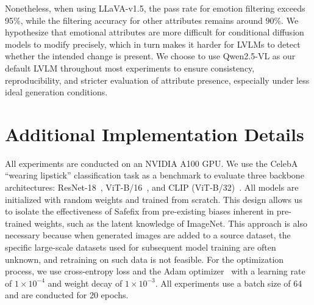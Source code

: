 \documentclass[10pt]{article} %
\newcommand{\qwen}{Qwen2.5-VL\xspace}
\newcommand{\llava}{LLaVA-v1.5\xspace}
\begin{document}
Nonetheless, when using \llava, the pass rate for emotion filtering exceeds 95\%, while the filtering accuracy for other attributes remains around 90\%. We hypothesize that emotional attributes are more difficult for conditional diffusion models to modify precisely, which in turn makes it harder for LVLMs to detect whether the intended change is present. We choose to use \qwen as our default LVLM throughout most experiments to ensure consistency, reproducibility, and stricter evaluation of attribute presence, especially under less ideal generation conditions.



\section{Additional Implementation Details} 
All experiments are conducted on an NVIDIA A100 GPU. We use the CelebA ``wearing lipstick'' classification task as a benchmark to evaluate three backbone architectures: ResNet-18~\citep{he2016deep}, ViT-B/16~\citep{dosovitskiy2020vit}, and CLIP (ViT-B/32)~\citep{radford2021learning}. All models are initialized with random weights and trained from scratch. This design allows us to isolate the effectiveness of Safefix from pre-existing biases inherent in pre-trained weights, such as the latent knowledge of ImageNet. This approach is also necessary because when generated images are added to a source dataset, the specific large-scale datasets used for subsequent model training are often unknown, and retraining on such data is not feasible. For the optimization process, we use cross-entropy loss and the Adam optimizer~\citep{kingma2015adam} with a learning rate of $1\times10^{-4}$ and weight decay of $1\times10^{-3}$. All experiments use a batch size of 64 and are conducted for 20 epochs.
\end{document}
